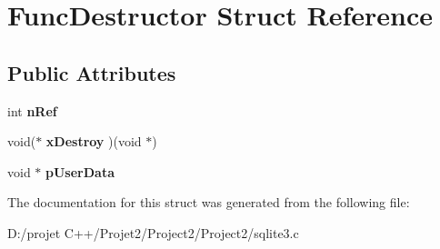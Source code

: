 \hypertarget{struct_func_destructor}{}\section{Func\+Destructor Struct Reference}
\label{struct_func_destructor}
\subsection*{Public Attributes}
\begin{DoxyCompactItemize}
\item 
\mbox{\label{struct_func_destructor_a8b1bf3af00c88400efc1dd74a4410463}} 
int {\bfseries n\+Ref}
\item 
\mbox{\label{struct_func_destructor_a53c33a1ad567b79570c783a8a65d6246}} 
void($\ast$ {\bfseries x\+Destroy} )(void $\ast$)
\item 
\mbox{\label{struct_func_destructor_a181875609f0f8221985cd6cfd7ad8cd8}} 
void $\ast$ {\bfseries p\+User\+Data}
\end{DoxyCompactItemize}


The documentation for this struct was generated from the following file\+:\begin{DoxyCompactItemize}
\item 
D\+:/projet C++/\+Projet2/\+Project2/\+Project2/sqlite3.\+c\end{DoxyCompactItemize}
